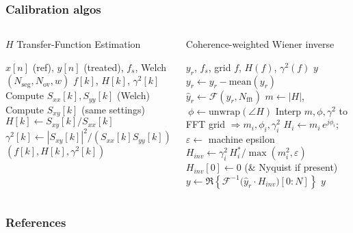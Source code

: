 \documentclass[aspectratio=169,10pt]{beamer}
\begin{document}
\begin{frame}
  \frametitle{Calibration algos}
\begin{columns}[c]
    \begin{algorithm}[H] %
        \footnotesize
        \caption{$H$ Transfer-Function Estimation}\label{alg:H}
        \begin{algorithmic}[1]
            \Require $x[n]$ (ref), $y[n]$ (treated), $f_s$, Welch $(N_{\mathrm{seg}},N_{\mathrm{ov}},w)$
            \Ensure $f[k]$, $H[k]$, $\gamma^2[k]$
            \State Compute $S_{xx}[k],S_{yy}[k]$ (Welch)
            \State Compute $S_{xy}[k]$ (same settings)
            \State $H[k]\gets S_{xy}[k]/S_{xx}[k]$
            \State $\gamma^2[k]\gets |S_{xy}[k]|^2/(S_{xx}[k]S_{yy}[k])$
            \State \Return $(f[k],H[k],\gamma^2[k])$
        \end{algorithmic}
    \end{algorithm}
        \begin{algorithm}[H]
            \footnotesize
            \caption{Coherence-weighted Wiener inverse}\label{alg:inv}
            \begin{algorithmic}[1]
                \Require $y_r$, $f_s$, grid $f$, $H(f)$, $\gamma^2(f)$
                \Ensure $y$
                \State $y_r \leftarrow y_r - \mathrm{mean}(y_r)$
                \State $\hat{y}_r\gets\mathcal{F}(y_r,N_{\mathrm{fft}})$
                \State $m\gets|H|$, $\ \phi\gets\mathrm{unwrap}(\angle H)$
                \State Interp $m,\phi,\gamma^2$ to FFT grid $\Rightarrow m_i,\phi_i,\gamma_i^2$
                \State $H_i\gets m_i\,e^{j\phi_i}$;\ \ $\varepsilon\gets$ machine epsilon
                \State $H_{\!inv}\gets \gamma_i^2\,H_i^{\!*}/\max(m_i^2,\varepsilon)$
                \State $H_{\!inv}[0]\gets 0$ \quad(\& Nyquist if present)
                \State $y\gets \Re\!\left\{\mathcal{F}^{-1}\!\big(\hat{y}_r\cdot H_{\!inv}\big)[0{:}N]\right\}$
                \State \Return $y$
            \end{algorithmic}
        \end{algorithm}

  \end{columns}
\end{frame}


\begin{frame}
    \frametitle{References}
    
    
\end{frame}
\end{document}
